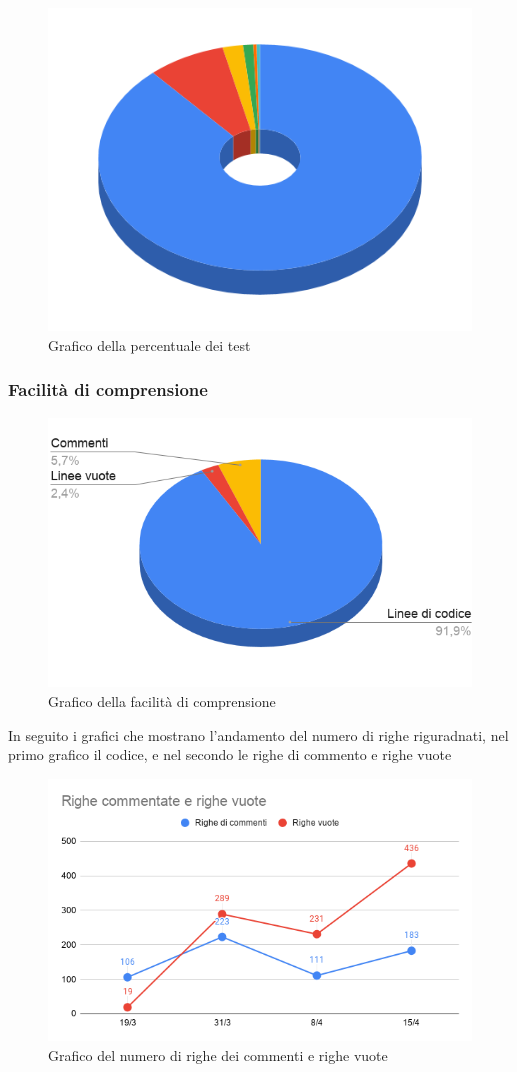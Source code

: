     \begin{figure}[H]
        \centering
        \includegraphics[width=10 cm]{source/sections/images/CC.png}
        \caption{Grafico della percentuale dei test}
    \end{figure}

    \subsubsection{Facilità di comprensione}

        \begin{figure}[H]
            \centering
            \includegraphics[width=10 cm]{source/sections/images/facilitaDelCodice.png}
            \caption{Grafico della facilità di comprensione}
        \end{figure}

    In seguito i grafici che mostrano l'andamento del numero di righe riguradnati, nel primo grafico il codice, e nel secondo
    le righe di commento e righe vuote

    \begin{figure}[H]
        \centering
        \includegraphics[width=10 cm]{source/sections/images/Valori-delle-righe.png}
        \caption{Grafico del numero di righe dei commenti e righe vuote}
    \end{figure}

